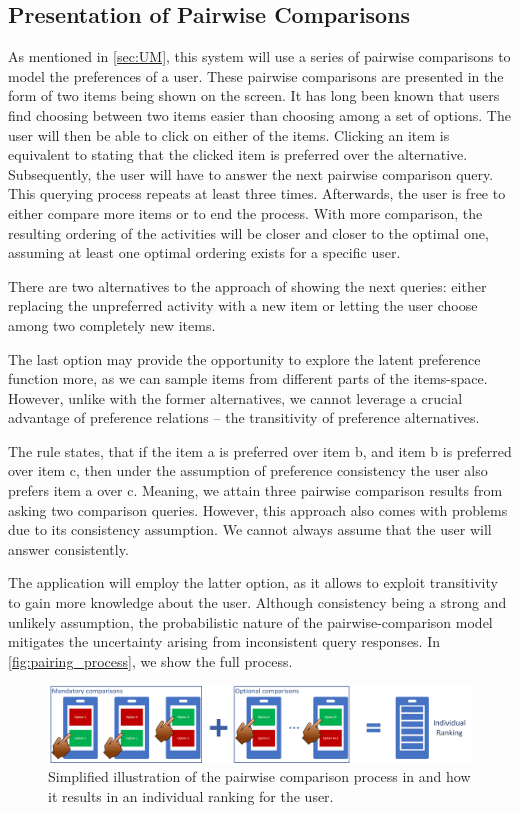\documentclass[11pt,a4paper,oneside]{article}
\begin{document}
\subsection{Presentation of Pairwise Comparisons}
As mentioned in \autoref{sec:UM}, this system will use a series of pairwise comparisons to model the preferences of a user. These pairwise comparisons are presented in the form of two items being shown on the screen. It has long been known that users find choosing between two items easier than choosing among a set of options. The user will then be able to click on either of the items. Clicking an item is equivalent to stating that the clicked item is preferred over the alternative. Subsequently, the user will have to answer the next pairwise comparison query. This querying process repeats at least three times. Afterwards, the user is free to either compare more items or to end the process. With more comparison, the resulting ordering of the activities will be closer and closer to the optimal one, assuming at least one optimal ordering exists for a specific user.

There are two alternatives to the approach of showing the next queries: either replacing the unpreferred activity with a new item or letting the user choose among two completely new items. 

The last option may provide the opportunity to explore the latent preference function more, as we can sample items from different parts of the items-space. However, unlike with the former alternatives, we cannot leverage a crucial advantage of preference relations -- the transitivity of preference alternatives.

The rule states, that if the item a is preferred over item b, and item b is preferred over item c, then under the assumption of preference consistency the user also prefers item a over c. Meaning, we attain three pairwise comparison results from asking two comparison queries. However, this approach also comes with problems due to its consistency assumption. We cannot always assume that the user will answer consistently.

The application will employ the latter option, as it allows to exploit transitivity to gain more knowledge about the user. Although consistency being a strong and unlikely assumption, the probabilistic nature of the pairwise-comparison model mitigates the uncertainty arising from inconsistent query responses.
In \autoref{fig:pairing_process}, we show the full process.
\begin{figure}[H]
    \centering
    \includegraphics[width=\textwidth]{paper/imgs/pairwise_comparisons.png}
    \caption{Simplified illustration of the pairwise comparison process in and how it results in an individual ranking for the user.}
    \label{fig:pairing_process}
\end{figure}
\end{document}
